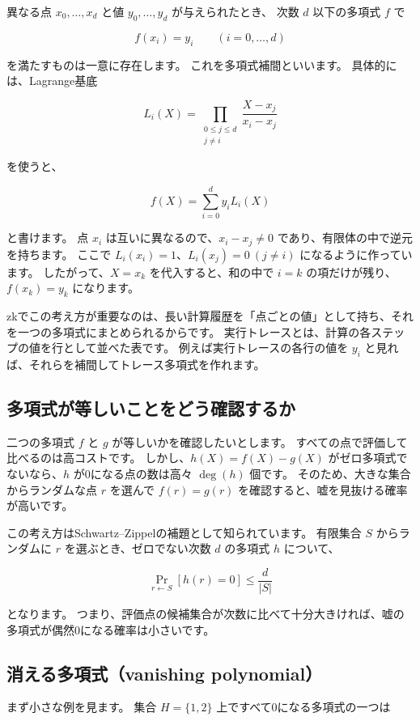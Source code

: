 \documentclass[a4paper,11pt]{ltjsarticle}
\begin{document}
異なる点 \(x_0,\ldots,x_d\) と値 \(y_0,\ldots,y_d\) が与えられたとき、
次数 \(d\) 以下の多項式 \(f\) で

\[
  f(x_i)=y_i \qquad (i=0,\ldots,d)
\]

を満たすものは一意に存在します。
これを多項式補間といいます。
具体的には、Lagrange基底

\[
  L_i(X)=\prod_{\substack{0\le j\le d\\j\ne i}}\frac{X-x_j}{x_i-x_j}
\]

を使うと、

\[
  f(X)=\sum_{i=0}^{d} y_i L_i(X)
\]

と書けます。
点 \(x_i\) は互いに異なるので、\(x_i-x_j\ne0\) であり、有限体の中で逆元を持ちます。
ここで \(L_i(x_i)=1\)、\(L_i(x_j)=0\ (j\ne i)\) になるように作っています。
したがって、\(X=x_k\) を代入すると、和の中で \(i=k\) の項だけが残り、\(f(x_k)=y_k\) になります。

zkでこの考え方が重要なのは、長い計算履歴を「点ごとの値」として持ち、それを一つの多項式にまとめられるからです。
実行トレースとは、計算の各ステップの値を行として並べた表です。
例えば実行トレースの各行の値を \(y_i\) と見れば、それらを補間してトレース多項式を作れます。

\subsection{多項式が等しいことをどう確認するか}

二つの多項式 \(f\) と \(g\) が等しいかを確認したいとします。
すべての点で評価して比べるのは高コストです。
しかし、\(h(X)=f(X)-g(X)\) がゼロ多項式でないなら、\(h\) が0になる点の数は高々 \(\deg(h)\) 個です。
そのため、大きな集合からランダムな点 \(r\) を選んで \(f(r)=g(r)\) を確認すると、嘘を見抜ける確率が高いです。

この考え方はSchwartz--Zippelの補題として知られています。
有限集合 \(S\) からランダムに \(r\) を選ぶとき、ゼロでない次数 \(d\) の多項式 \(h\) について、

\[
  \Pr_{r\leftarrow S}[h(r)=0] \le \frac{d}{|S|}
\]

となります。
つまり、評価点の候補集合が次数に比べて十分大きければ、嘘の多項式が偶然0になる確率は小さいです。

\subsection{消える多項式（vanishing polynomial）}

まず小さな例を見ます。
集合 \(H=\{1,2\}\) 上ですべて0になる多項式の一つは
\end{document}

